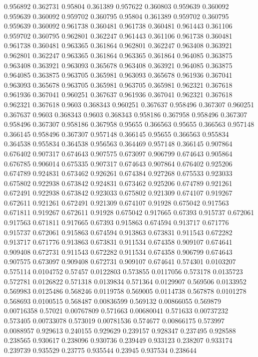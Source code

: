 0.956892 0.362731
0.95804 0.361389
0.957622 0.360803
0.959639 0.360092
0.959639 0.360092
0.959702 0.360795
0.95804 0.361389
0.959702 0.360795
0.959639 0.360092
0.961738 0.360481
0.961738 0.360481
0.961443 0.361106
0.959702 0.360795
0.962801 0.362247
0.961443 0.361106
0.961738 0.360481
0.961738 0.360481
0.963365 0.361864
0.962801 0.362247
0.963408 0.363921
0.962801 0.362247
0.963365 0.361864
0.963365 0.361864
0.964085 0.363875
0.963408 0.363921
0.963093 0.365678
0.963408 0.363921
0.964085 0.363875
0.964085 0.363875
0.963705 0.365981
0.963093 0.365678
0.961936 0.367041
0.963093 0.365678
0.963705 0.365981
0.963705 0.365981
0.962321 0.367618
0.961936 0.367041
0.960251 0.367637
0.961936 0.367041
0.962321 0.367618
0.962321 0.367618
0.9603 0.368343
0.960251 0.367637
0.958496 0.367307
0.960251 0.367637
0.9603 0.368343
0.9603 0.368343
0.958186 0.367958
0.958496 0.367307
0.958496 0.367307
0.958186 0.367958
0.95655 0.366563
0.95655 0.366563
0.957148 0.366145
0.958496 0.367307
0.957148 0.366145
0.95655 0.366563
0.955834 0.364538
0.955834 0.364538
0.956563 0.364469
0.957148 0.366145
0.907864 0.676402
0.907317 0.674643
0.907575 0.673097
0.906799 0.674643
0.905864 0.676785
0.906014 0.675335
0.907317 0.674643
0.907864 0.676402
0.925206 0.674789
0.924831 0.673462
0.926261 0.674384
0.927268 0.675533
0.923033 0.675802
0.922938 0.673842
0.924831 0.673462
0.925206 0.674789
0.921261 0.672491
0.922938 0.673842
0.923033 0.675802
0.921309 0.674107
0.919267 0.672611
0.921261 0.672491
0.921309 0.674107
0.91928 0.675042
0.917563 0.671811
0.919267 0.672611
0.91928 0.675042
0.917665 0.67393
0.915737 0.672061
0.917563 0.671811
0.917665 0.67393
0.915863 0.674594
0.913717 0.671776
0.915737 0.672061
0.915863 0.674594
0.913863 0.673831
0.911543 0.672282
0.913717 0.671776
0.913863 0.673831
0.911534 0.674358
0.909107 0.674641
0.909408 0.672731
0.911543 0.672282
0.911534 0.674358
0.906799 0.674643
0.907575 0.673097
0.909408 0.672731
0.909107 0.674641
0.574301 0.0103207
0.575114 0.0104752
0.57457 0.0122803
0.573855 0.0117056
0.573178 0.0135723
0.572781 0.0126822
0.571318 0.0139834
0.571364 0.0129907
0.569506 0.0133952
0.569983 0.0125486
0.568246 0.0119758
0.569005 0.0114738
0.567878 0.0101278
0.568693 0.0100515
0.568487 0.00836599
0.569132 0.00866055
0.569879 0.00716358
0.57021 0.00767809
0.571663 0.00680041
0.571633 0.00737232
0.573405 0.00733078
0.573019 0.00781536
0.574677 0.00866175
0.573997 0.0088957
0.929613 0.240155
0.929629 0.239157
0.928347 0.237495
0.928588 0.238565
0.930617 0.238096
0.930736 0.239449
0.933123 0.238207
0.933174 0.239739
0.935529 0.23775
0.935544 0.23945
0.937534 0.238644
